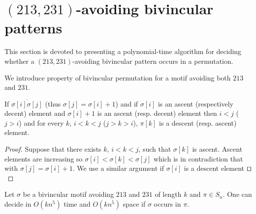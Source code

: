 \documentclass[a4paper]{llncs}
\newcommand{\pmotif}{\sigma}
\begin{document}

\section{$(213,231)$-avoiding bivincular patterns}
	\label{section:bivincular}

		This section is devoted to presenting a polynomial-time algorithm for deciding whether
	a $(213,231)$-avoiding bivincular pattern occurs in a permutation.

We introduce property of bivincular permutation for a motif avoiding both $213$ and $231$.

\begin{lemma}
\label{lemma:ascentDescentAscent}
If $\overline{\sigma[i]\sigma[j]}$ (thus $\sigma[j]=\sigma[i]+1$) and if $\sigma[i]$ is an ascent (respectively decent) element and $\sigma[i]+1$ is an ascent (resp. decent) element then $i<j$ ($j>i$) and for every $k$, $i<k<j$ ($j>k>i$), $\pi[k]$ is a descent (resp. ascent) element.    
\end{lemma}

\begin{proof}
Suppose that there exists $k$, $i<k<j$,
such that $\pmotif[k]$ is ascent. Ascent elements are increasing  so $\sigma[i]<\sigma[k]<\sigma[j]$ which is in contradiction that with $\sigma[j]=\sigma[i]+1$.
We use a similar argument if $\sigma[i]$ is a descent element
$\qed$
\end{proof}

	\begin{proposition}
		\label{Proposition:bivincular pattern}
			Let $\sigma$ be a bivincular motif avoiding $213$ and $231$ of length $k$
			and $\pi \in S_n$.
			One can decide in $O(kn^5)$ time
			and $O(kn^5)$ space if $\sigma$ occurs in $\pi$.
	\end{proposition}
\end{document}
